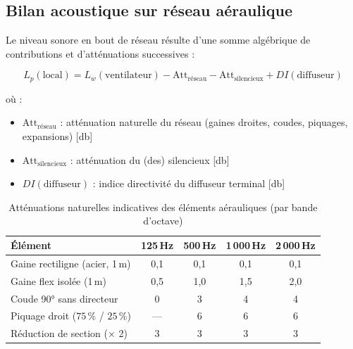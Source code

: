\subsection{Bilan acoustique sur réseau aéraulique}

Le niveau sonore en bout de réseau résulte d'une somme algébrique de contributions et d'atténuations successives :

\begin{equation}
  L_p(\text{local}) = L_w(\text{ventilateur}) - \text{Att}_{\text{réseau}} - \text{Att}_{\text{silencieux}} + DI(\text{diffuseur})
\end{equation}

où :
\begin{itemize}
  \item $\text{Att}_{\text{réseau}}$ : atténuation naturelle du réseau (gaines droites, coudes, piquages, expansions) [\si{\decibel}]
  \item $\text{Att}_{\text{silencieux}}$ : atténuation du (des) silencieux [\si{\decibel}]
  \item $DI(\text{diffuseur})$ : indice directivité du diffuseur terminal [\si{\decibel}]
\end{itemize}

\begin{table}[H]
  \centering
  \caption{Atténuations naturelles indicatives des éléments aérauliques (par bande d'octave)}
  \begin{tabular}{lcccc}
    \toprule
    Élément & 125\,Hz & 500\,Hz & 1\,000\,Hz & 2\,000\,Hz \\
    \midrule
    Gaine rectiligne (acier, 1\,m) & 0,1 & 0,1 & 0,1 & 0,1 \\
    Gaine flex isolée (1\,m) & 0,5 & 1,0 & 1,5 & 2,0 \\
    Coude 90° sans directeur & 0 & 3 & 4 & 4 \\
    Piquage droit ($75\,\%$ / $25\,\%$) & — & 6 & 6 & 6 \\
    Réduction de section ($\times$ 2) & 3 & 3 & 3 & 3 \\
    \bottomrule
  \end{tabular}
\end{table}


